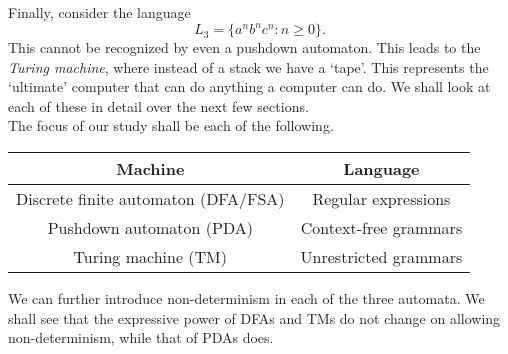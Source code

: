 Finally, consider the language
\[ L_3 = \{a^nb^nc^n : n \ge 0\}. \]
This cannot be recognized by even a pushdown automaton. This leads to the \emph{Turing machine}, where instead of a stack we have a `tape'. This represents the `ultimate' computer that can do anything a computer can do. We shall look at each of these in detail over the next few sections.\\

The focus of our study shall be each of the following.

\begin{center}
\begin{tabular}{|c|c|}
	\hline Machine & Language \\
	\hline
	Discrete finite automaton (DFA/FSA) & Regular expressions \\
	Pushdown automaton (PDA) & Context-free grammars \\
	Turing machine (TM) & Unrestricted grammars \\
	\hline
\end{tabular}
\end{center}

We can further introduce non-determinism in each of the three automata. We shall see that the expressive power of DFAs and TMs do not change on allowing non-determinism, while that of PDAs does.